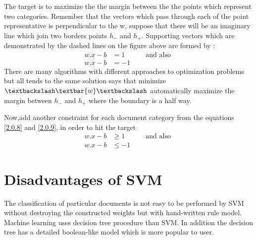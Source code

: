 The target is to maximize the the margin between the the points which represent two categories. Remember that the vectors which pass through each of the point representative is perpendicular to the w, suppose that there will be an imaginary line which join two borders points $ h_{-}$ and $ h_{+}$.
Supporting vectors which are demonstrated by the dashed lines on the figure above  are formed by :
\begin{align}
w.x- b & = 1 \label{2.0.8} \quad \quad \quad  \text{and also } \\
w.x- b & = -1 \label{2.0.9}
\end{align}
There are many algorithms with different approaches to optimization problems but all tends to the same solution says that minimize $\textbackslash\textbar{ w} \textbackslash$ automatically maximize the margin between $ h_{-}$ and $ h_{+}$ where the boundary is a half way.
%

Now,add another constraint for each document category from the equations \eqref{2.0.8} and \eqref{2.0.9}, in order to hit the target
\begin{align}
w.x- b & \geq     1 \label{2.0.8} \quad \quad \quad  \text{and also } \\
w.x- b & \leq -1 \label{2.0.9}
\end{align}


\section{Disadvantages of SVM} 
The classification of particular documents is not easy to be performed by SVM without destroying the constructed weights  but with hand-written rule model. Machine learning uses decision tree procedure than SVM. In addition the decision tree has a detailed boolean-like  model which is more popular to user.

